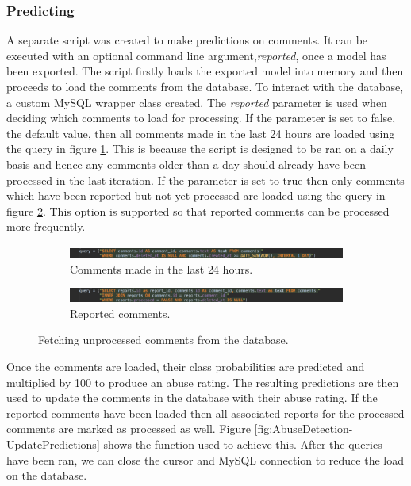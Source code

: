 \subsubsection{Predicting}
A separate script was created to make predictions on comments. It can be executed with an optional command line argument,\textit{reported}, once a model has been exported. The script firstly loads the exported model into memory and then proceeds to load the comments from the database. To interact with the database, a custom MySQL wrapper class created. The \textit{reported} parameter is used when deciding which comments to load for processing. If the parameter is set to false, the default value, then all comments made in the last 24 hours are loaded using the query in figure \ref{fig:AbuseDetection-DailyComments}. This is because the script is designed to be ran on a daily basis and hence any comments older than a day should already have been processed in the last iteration. If the parameter is set to true then only comments which have been reported but not yet processed are loaded using the query in figure \ref{fig:AbuseDetection-ReportedComments}. This option is supported so that reported comments can be processed more frequently.
\begin{figure}[H]
	\centering
	\begin{subfigure}[t]{\linewidth}
		\centering
		\includegraphics[width=\linewidth]{Images/Implementation/DataProcessing/AbuseDetection/DailyCommentsQuery}
		\caption{Comments made in the last 24 hours.}\label{fig:AbuseDetection-DailyComments}		
	\end{subfigure}
	\quad
	\begin{subfigure}[t]{\linewidth}
		\centering
		\includegraphics[width=\linewidth]{Images/Implementation/DataProcessing/AbuseDetection/ReportedCommentsQuery}
		\caption{Reported comments.}\label{fig:AbuseDetection-ReportedComments}
	\end{subfigure}
	\caption{Fetching unprocessed comments from the database.}\label{fig:AbuseDetection-LoadingComments}
\end{figure}

Once the comments are loaded, their class probabilities are predicted and multiplied by 100 to produce an abuse rating. The resulting predictions are then used to update the comments in the database with their abuse rating. If the reported comments have been loaded then all associated reports for the processed comments are marked as processed as well. Figure \ref{fig:AbuseDetection-UpdatePredictions} shows the function used to achieve this. After the queries have been ran, we can close the cursor and MySQL connection to reduce the load on the database.

